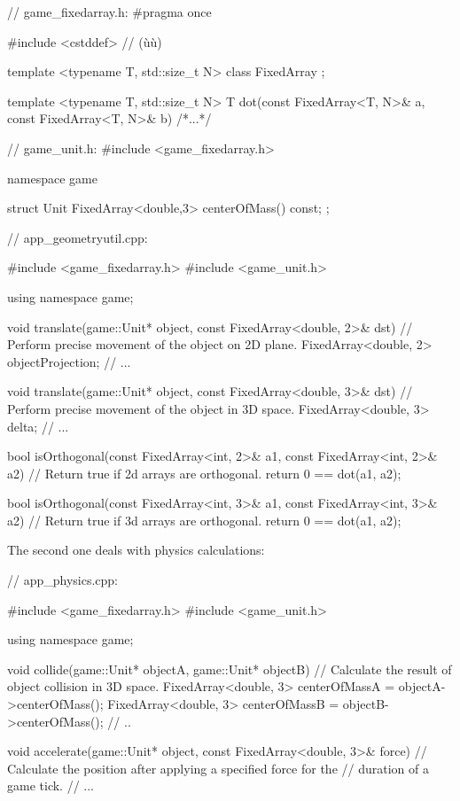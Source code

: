 \begin{emcppshiddenlisting}[emcppsbatch=e5]
// game_fixedarray.h:
#pragma once

#include <cstddef>  // (ù{}ù)

template <typename T, std::size_t N>
class FixedArray {};

template <typename T, std::size_t N>
T dot(const FixedArray<T, N>& a, const FixedArray<T, N>& b) { /*...*/ }

// game_unit.h:
#include <game_fixedarray.h>

namespace game {

struct Unit {
      FixedArray<double,3> centerOfMass() const;
};

}
\end{emcppshiddenlisting}
\begin{emcppslisting}[emcppsbatch=e5]
// app_geometryutil.cpp:

#include <game_fixedarray.h>
#include <game_unit.h>

using namespace game;

void translate(game::Unit* object, const FixedArray<double, 2>& dst)
    // Perform precise movement of the object on 2D plane.
{
    FixedArray<double, 2> objectProjection;
    // ...
}

void translate(game::Unit* object, const FixedArray<double, 3>& dst)
    // Perform precise movement of the object in 3D space.
{
    FixedArray<double, 3> delta;
    // ...
}

bool isOrthogonal(const FixedArray<int, 2>& a1, const FixedArray<int, 2>& a2)
    // Return true if 2d arrays are orthogonal.
{
    return 0 == dot(a1, a2);
}

bool isOrthogonal(const FixedArray<int, 3>& a1, const FixedArray<int, 3>& a2)
    // Return true if 3d arrays are orthogonal.
{
    return 0 == dot(a1, a2);
}
\end{emcppslisting}

\noindent The second one deals with physics calculations:

\begin{emcppslisting}[emcppsbatch=e5]
// app_physics.cpp:

#include <game_fixedarray.h>
#include <game_unit.h>

using namespace game;

void collide(game::Unit* objectA, game::Unit* objectB)
    // Calculate the result of object collision in 3D space.
{
    FixedArray<double, 3> centerOfMassA = objectA->centerOfMass();
    FixedArray<double, 3> centerOfMassB = objectB->centerOfMass();
    // ..
}

void accelerate(game::Unit* object, const FixedArray<double, 3>& force)
    // Calculate the position after applying a specified force for the
    // duration of a game tick.
{
    // ...
}
\end{emcppslisting}

